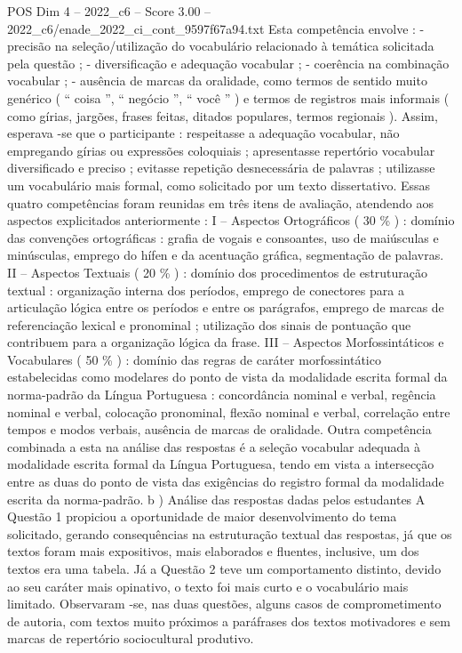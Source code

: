 \begin{textsample}{POS Dim 4 – 2022\_c6 – Score 3.00 – 2022\_c6/enade\_2022\_ci\_cont\_9597f67a94.txt}
Esta competência envolve : - precisão na seleção/utilização do vocabulário relacionado à temática solicitada pela questão ; - diversificação e adequação vocabular ; - coerência na combinação vocabular ; - ausência de marcas da oralidade, como termos de sentido muito genérico ( “ coisa ”, “ negócio ”, “ você ” ) e termos de registros mais informais ( como gírias, jargões, frases feitas, ditados populares, termos regionais ).
Assim, esperava -se que o participante : respeitasse a adequação vocabular, não empregando gírias ou expressões coloquiais ; apresentasse repertório vocabular diversificado e preciso ; evitasse repetição desnecessária de palavras ; utilizasse um vocabulário mais formal, como solicitado por um texto dissertativo.
Essas quatro competências foram reunidas em três itens de avaliação, atendendo aos aspectos explicitados anteriormente : I – Aspectos Ortográficos ( 30 \% ) : domínio das convenções ortográficas : grafia de vogais e consoantes, uso de maiúsculas e minúsculas, emprego do hífen e da acentuação gráfica, segmentação de palavras.
II – Aspectos Textuais ( 20 \% ) : domínio dos procedimentos de estruturação textual : organização interna dos períodos, emprego de conectores para a articulação lógica entre os períodos e entre os parágrafos, emprego de marcas de referenciação lexical e pronominal ; utilização dos sinais de pontuação que contribuem para a organização lógica da frase.
III – Aspectos Morfossintáticos e Vocabulares ( 50 \% ) : domínio das regras de caráter morfossintático estabelecidas como modelares do ponto de vista da modalidade escrita formal da norma-padrão da Língua Portuguesa : concordância nominal e verbal, regência nominal e verbal, colocação pronominal, flexão nominal e verbal, correlação entre tempos e modos verbais, ausência de marcas de oralidade.
Outra competência combinada a esta na análise das respostas é a seleção vocabular adequada à modalidade escrita formal da Língua Portuguesa, tendo em vista a intersecção entre as duas do ponto de vista das exigências do registro formal da modalidade escrita da norma-padrão. b ) Análise das respostas dadas pelos estudantes A Questão 1 propiciou a oportunidade de maior desenvolvimento do tema solicitado, gerando consequências na estruturação textual das respostas, já que os textos foram mais expositivos, mais elaborados e fluentes, inclusive, um dos textos era uma tabela.
Já a Questão 2 teve um comportamento distinto, devido ao seu caráter mais opinativo, o texto foi mais curto e o vocabulário mais limitado.
Observaram -se, nas duas questões, alguns casos de comprometimento de autoria, com textos muito próximos a paráfrases dos textos motivadores e sem marcas de repertório sociocultural produtivo.

\end{textsample}
